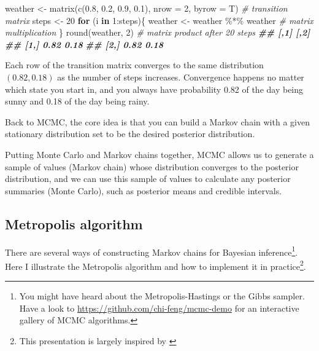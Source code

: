 \documentclass[
  12pt,
]{krantz}
\makeatletter
\newenvironment{Shaded}{\begin{snugshade}}{\end{snugshade}}
\newcommand{\AttributeTok}[1]{\textcolor[rgb]{0.77,0.63,0.00}{#1}}
\newcommand{\CommentTok}[1]{\textcolor[rgb]{0.56,0.35,0.01}{\textit{#1}}}
\newcommand{\ControlFlowTok}[1]{\textcolor[rgb]{0.13,0.29,0.53}{\textbf{#1}}}
\newcommand{\DecValTok}[1]{\textcolor[rgb]{0.00,0.00,0.81}{#1}}
\newcommand{\DocumentationTok}[1]{\textcolor[rgb]{0.56,0.35,0.01}{\textbf{\textit{#1}}}}
\newcommand{\FloatTok}[1]{\textcolor[rgb]{0.00,0.00,0.81}{#1}}
\newcommand{\FunctionTok}[1]{\textcolor[rgb]{0.00,0.00,0.00}{#1}}
\newcommand{\NormalTok}[1]{#1}
\newcommand{\OtherTok}[1]{\textcolor[rgb]{0.56,0.35,0.01}{#1}}
\newcommand{\SpecialCharTok}[1]{\textcolor[rgb]{0.00,0.00,0.00}{#1}}
\newenvironment{kframe}{%
\medskip{}
\setlength{\fboxsep}{.8em}
 \def\at@end@of@kframe{}%
 \ifinner\ifhmode%
  \def\at@end@of@kframe{\end{minipage}}%
  \begin{minipage}{\columnwidth}%
 \fi\fi%
 \def\FrameCommand##1{\hskip\@totalleftmargin \hskip-\fboxsep
 \colorbox{shadecolor}{##1}\hskip-\fboxsep
     \hskip-\linewidth \hskip-\@totalleftmargin \hskip\columnwidth}%
 \MakeFramed {\advance\hsize-\width
   \@totalleftmargin\z@ \linewidth\hsize
   \@setminipage}}%
 {\par\unskip\endMakeFramed%
 \at@end@of@kframe}
\newenvironment{rmdblock}[1]
  {
  \begin{itemize}
  \renewcommand{\labelitemi}{
    \raisebox{-.7\height}[0pt][0pt]{
      {\setkeys{Gin}{width=3em,keepaspectratio}\texttt{[image: images/\#1]}}
    }
  }
  \setlength{\fboxsep}{1em}
  \begin{kframe}
  \item
  }
  {
  \end{kframe}
  \end{itemize}
  }
\newenvironment{rmdnote}
  {\begin{rmdblock}{note}}
  {\end{rmdblock}}
\makeatother
\begin{document}
\begin{Shaded}
\begin{Highlighting}[]
\NormalTok{weather }\OtherTok{\textless{}{-}} \FunctionTok{matrix}\NormalTok{(}\FunctionTok{c}\NormalTok{(}\FloatTok{0.8}\NormalTok{, }\FloatTok{0.2}\NormalTok{, }\FloatTok{0.9}\NormalTok{, }\FloatTok{0.1}\NormalTok{), }\AttributeTok{nrow =} \DecValTok{2}\NormalTok{, }\AttributeTok{byrow =}\NormalTok{ T) }\CommentTok{\# transition matrix}
\NormalTok{steps }\OtherTok{\textless{}{-}} \DecValTok{20}
\ControlFlowTok{for}\NormalTok{ (i }\ControlFlowTok{in} \DecValTok{1}\SpecialCharTok{:}\NormalTok{steps)\{}
\NormalTok{  weather }\OtherTok{\textless{}{-}}\NormalTok{ weather }\SpecialCharTok{\%*\%}\NormalTok{ weather }\CommentTok{\# matrix multiplication}
\NormalTok{\}}
\FunctionTok{round}\NormalTok{(weather, }\DecValTok{2}\NormalTok{) }\CommentTok{\# matrix product after 20 steps}
\DocumentationTok{\#\#      [,1] [,2]}
\DocumentationTok{\#\# [1,] 0.82 0.18}
\DocumentationTok{\#\# [2,] 0.82 0.18}
\end{Highlighting}
\end{Shaded}

Each row of the transition matrix converges to the same distribution \((0.82, 0.18)\) as the number of steps increases. Convergence happens no matter which state you start in, and you always have probability 0.82 of the day being sunny and 0.18 of the day being rainy.

Back to MCMC, the core idea is that you can build a Markov chain with a given stationary distribution set to be the desired posterior distribution.

\begin{rmdnote}
Putting Monte Carlo and Markov chains together, MCMC allows us to generate a sample of values (Markov chain) whose distribution converges to the posterior distribution, and we can use this sample of values to calculate any posterior summaries (Monte Carlo), such as posterior means and credible intervals.
\end{rmdnote}

\hypertarget{metropolis-algorithm}{%
\subsection{Metropolis algorithm}\label{metropolis-algorithm}}

There are several ways of constructing Markov chains for Bayesian inference\footnote{You might have heard about the Metropolis-Hastings or the Gibbs sampler. Have a look to \url{https://github.com/chi-feng/mcmc-demo} for an interactive gallery of MCMC algorithms.}. Here I illustrate the Metropolis algorithm and how to implement it in practice\footnote{This presentation is largely inspired by \citet{alberthu2019}}.
\end{document}
